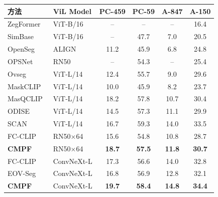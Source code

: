\begin{table}[!htbp]\centering
    \vspace{0.5em}\centering\wuhao
    \begin{tabular}{llcccc}
        \toprule
        方法 & ViL Model & PC-459 & PC-59 & A-847 & A-150 \\
        \midrule
        ZegFormer~\cite{ding2022decoupling}    & ViT-B/16   & --    & --    & --    & 16.4 \\
        SimBase~\cite{xu2022simple}            & ViT-B/16   & --    & 47.7  & 7.0   & 20.5 \\
        OpenSeg~\cite{ghiasi2022scaling}       & ALIGN      & 11.2  & 45.9  & 6.8   & 24.8 \\
        OPSNet~\cite{chen2023open}             & RN50       & --    & 54.3  & --    & 25.4 \\
        \midrule
        Ovseg~\cite{liang2023open}             & ViT-L/14   & 12.4  & 55.7  & 9.0   & 29.6 \\
        MaskCLIP~\cite{ding2023open}           & ViT-L/14   & 10.0  & 45.9  & 8.2   & 23.7 \\
        MasQCLIP~\cite{MasQCLIP}         & ViT-L/14   & 18.2  & 57.8  & 10.7  & 30.4 \\
        ODISE~\cite{xu2023open}                & ViT-L/14   & 14.5  & 57.3  & 11.1  & 29.9 \\
        SCAN~\cite{liu2024open}                & ViT-L/14   & 16.7  & 59.3  & 14.0  & 33.5 \\
        \midrule
        FC-CLIP~\cite{yu2023convolutions}      & RN50$\times$64 & 15.6 & 54.8 & 10.8 & 28.7 \\
        \textbf{CMPF}                          & RN50$\times$64 & \textbf{18.7} & \textbf{57.5} & \textbf{11.8} & \textbf{30.7} \\
        \midrule
        FC-CLIP~\cite{yu2023convolutions}      & ConvNeXt-L & 17.3  & 56.6  & 14.0  & 32.8 \\
        EOV-Seg~\cite{niu2025eov}              & ConvNeXt-L & 16.8  & 56.9  & 12.8  & 32.1 \\
        \textbf{CMPF}                          & ConvNeXt-L & \textbf{19.7} & \textbf{58.4} & \textbf{14.8} & \textbf{34.4} \\
        \bottomrule
    \end{tabular}
\end{table}
